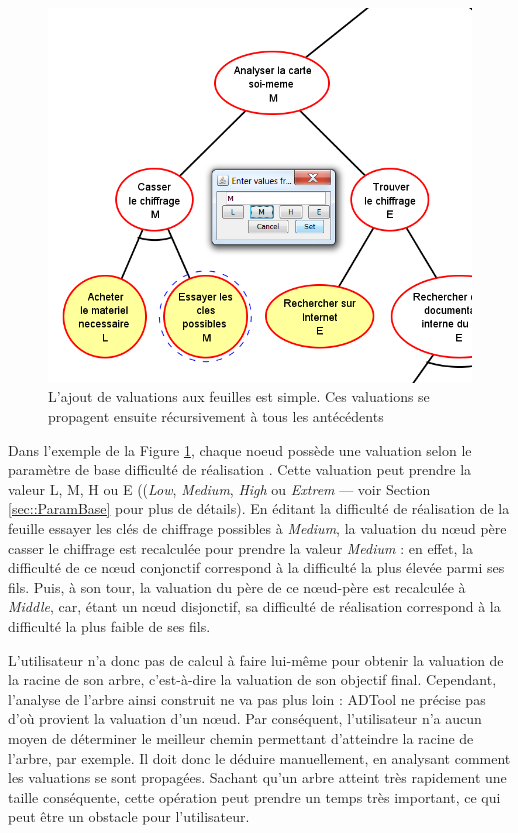 	\begin{figure}[h]
            \centering
            \includegraphics[width=1\textwidth]{figure/adtool_add_values.png}
            \caption{L'ajout de valuations aux feuilles est simple. Ces valuations se propagent ensuite récursivement à tous les antécédents }
            \label{fig:arbre_exemple_1}
    \end{figure}
	
	Dans l'exemple de la {\sc Figure} \ref{fig:arbre_exemple_1}, chaque noeud possède une valuation selon le paramètre de base \og difficulté de réalisation \fg{}. Cette valuation peut prendre la valeur L, M, H ou E ((\emph{Low}, \emph{Medium}, \emph{High} ou \emph{Extrem} --- voir Section \ref{sec::ParamBase} pour plus de détails). En éditant la difficulté de réalisation de la feuille \og essayer les clés de chiffrage possibles \fg{}  à \emph{Medium}, la valuation du nœud père \og casser le chiffrage \fg{} est recalculée pour prendre la valeur \emph{Medium} : en effet, la difficulté de ce nœud conjonctif correspond à la difficulté la plus élevée parmi ses fils. Puis, à son tour, la valuation du père de ce nœud-père est recalculée à \emph{Middle}, car, étant un nœud disjonctif, sa difficulté de réalisation correspond à la difficulté la plus faible de ses fils.
	
	L'utilisateur n'a donc pas de calcul à faire lui-même pour obtenir la valuation de la racine de son arbre, c'est-à-dire la valuation de son objectif final. Cependant, l'analyse de l'arbre ainsi construit ne va pas plus loin : ADTool ne précise pas d'où provient la valuation d'un nœud. %
	 Par conséquent, l'utilisateur n'a aucun moyen de déterminer le \og meilleur chemin \fg{} permettant d'atteindre la racine de l'arbre, par exemple. Il doit donc le déduire manuellement, en analysant comment les valuations se sont propagées. Sachant qu'un arbre atteint très rapidement une taille conséquente, cette opération peut prendre un temps très important, ce qui peut être un obstacle pour l'utilisateur.
	
